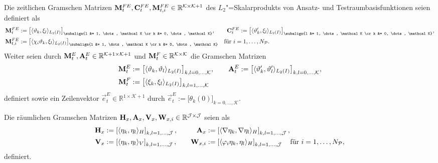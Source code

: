 \documentclass[../main.tex]{subfiles}
\begin{document}
\begin{Definition}
\label{definition:zeitliche_bausteine}
    Die zeitlichen Gramschen Matrizen $\mathbf{M}_{t}^{FE}, \mathbf{C}_{t}^{FE}, \mathbf{M}_{t,i}^{FE} \in \mathbb{R}^{\mathcal K \times \mathcal K + 1}$ des $L_{2}$"=Skalarprodukts von Ansatz- und Testraumbasisfunktionen seien definiert als
    \begin{align}
        \mat{M}_{t}^{FE} &:= \big[ \skp{\theta_{k}}{\xi_{l}}{L_{2}(I)} \big]_{\subalign{l &= 1, \dots, \mathcal K \cr k &= 0, \dots, \mathcal K}},
        \qquad
        \mat{C}_{t}^{FE} := \big[ \skp{\theta_{k}'}{\xi_{l}}{L_{2}(I)} \big]_{\subalign{l &= 1, \dots, \mathcal K \cr k &= 0, \dots, \mathcal K}},
        \\
        \mat{M}_{t,i}^{FE} &:= \big[ \skp{\chi_{i}\theta_{k}}{\xi_{l}}{L_{2}(I)} \big]_{\subalign{l &= 1, \dots, \mathcal K \cr k &= 0, \dots, \mathcal K}} \quad \text{für } i = 1, \dots, N_{\mathcal P}.
    \end{align}
    Weiter seien durch $\mathbf{M}_{t}^{E}, \mathbf{A}_{t}^{E} \in \mathbb{R}^{\mathcal K + 1\times \mathcal K + 1}$ und $\mathbf{M}_{t}^{F} \in \mathbb{R}^{\mathcal K \times \mathcal K}$ die Gramschen Matrizen
    \begin{align}
        \mathbf{M}_{t}^{E} &:= \big[ \langle\vartheta_{k},\vartheta_{l}\rangle_{L_{2}(I)}\big]_{k,l = 0, \dots, \mathcal K},
        \qquad
        \mathbf{A}_{t}^{E} := \big[ \langle\vartheta_{k}',\vartheta_{l}'\rangle_{L_{2}(I)}\big]_{k,l = 0, \dots, \mathcal K},
        \\
        \mathbf{M}_{t}^{F} &:= \big[ \langle\xi_{k},\xi_{l}\rangle_{L_{2}(I)}\big]_{k,l = 1, \dots, \mathcal K}
    \end{align}
    definiert sowie ein Zeilenvektor $\vec{e}^{E}_{t} \in \mathbb{R}^{1 \times \mathcal K + 1}$ durch
    $\vec{e}^{E}_{t} := \big[ \theta_{k}(0) \big]_{k = 0, \dots, \mathcal K}$.
\end{Definition}

\begin{Definition}
\label{definition:raeumliche_bausteine}
    Die räumlichen Gramschen Matrizen $\mathbf{H}_{x}, \mathbf{A}_{x}, \mathbf{V}_{x}, \mathbf{W}_{x,i} \in \mathbb{R}^{\mathcal J \times \mathcal J}$ seien als
    \begin{equation}
    \begin{aligned}
        \mathbf{H}_{x} &:= \left[ \langle\eta_{k},\eta_{l}\rangle_{H} \right]_{k,l=1, \dots, \mathcal J},&
        \quad
        \mathbf{A}_{x} &:= \left[ \langle\nabla \eta_{k},\nabla \eta_{l}\rangle_{H} \right]_{k,l=1, \dots, \mathcal J},
        \\
        \mathbf{V}_{x} &:= \left[ \langle\eta_{k},\eta_{l}\rangle_{V} \right]_{k,l = 1, \dots, \mathcal J},&
        \quad
        \mathbf{W}_{x,i} &:= \left[ \langle\varphi_{i} \eta_{k},\eta_{l}\rangle_{H} \right]_{k, l = 1, \dots, \mathcal J} \quad \text{für } i = 1, \dots, N_{\mathcal P},
    \end{aligned}
    \end{equation}
    definiert.
\end{Definition}
\end{document}

